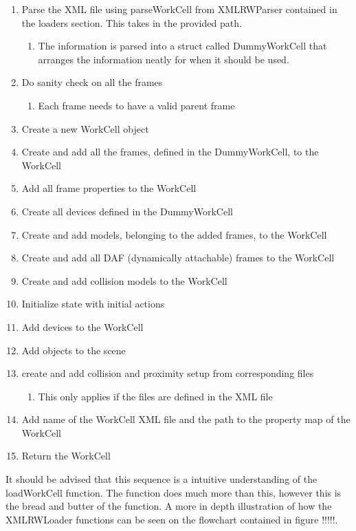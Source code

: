 \begin{enumerate}
	\item Parse the XML file using parseWorkCell from XMLRWParser contained in the loaders section. This takes in the provided path.
	\begin{enumerate}
		\item The information is parsed into a struct called DummyWorkCell that arranges the information neatly for when it should be used.
	\end{enumerate}
	\item Do sanity check on all the frames
	\begin{enumerate}
		\item Each frame needs to have a valid parent frame
	\end{enumerate}
	\item Create a new WorkCell object
	\item Create and add all the frames, defined in the DummyWorkCell, to the WorkCell
	\item Add all frame properties to the WorkCell
	\item Create all devices defined in the DummyWorkCell
	\item Create and add models, belonging to the added frames, to the WorkCell
	\item Create and add all DAF (dynamically attachable) frames to the WorkCell
	\item Create and add collision models to the WorkCell
	\item Initialize state with initial actions
	\item Add devices to the WorkCell
	\item Add objects to the scene
	\item create and add collision and proximity setup from corresponding files
	\begin{enumerate}
		\item This only applies if the files are defined in the XML file
	\end{enumerate}
	\item Add name of the WorkCell XML file and the path to the property map of the WorkCell
	\item Return the WorkCell
\end{enumerate}

It should be advised that this sequence is a intuitive understanding of the loadWorkCell function. The function does much more than this, however this is the bread and butter of the function. A more in depth illustration of how the XMLRWLoader functions can be seen on the flowchart contained in figure !!!!!.

